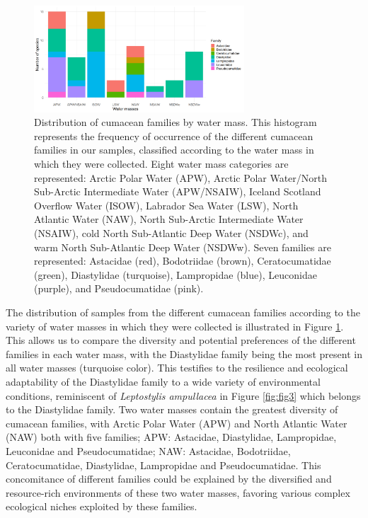 \begin{figure}[htbp]
    \centering
    \includegraphics[width=0.7\textwidth]{figure3.png}
    \caption{Distribution of cumacean families by water mass. This histogram represents the frequency of occurrence of the different cumacean families in our samples, classified according to the water mass in which they were collected. Eight water mass categories are represented: Arctic Polar Water (APW), Arctic Polar Water/North Sub-Arctic Intermediate Water (APW/NSAIW), Iceland Scotland Overflow Water (ISOW), Labrador Sea Water (LSW), North Atlantic Water (NAW), North Sub-Arctic Intermediate Water (NSAIW), cold North Sub-Atlantic Deep Water (NSDWc), and warm North Sub-Atlantic Deep Water (NSDWw). Seven families are represented: Astacidae (red), Bodotriidae (brown), Ceratocumatidae (green), Diastylidae (turquoise), Lampropidae (blue), Leuconidae (purple), and Pseudocumatidae (pink). \label{fig:fig4}}
\end{figure}

The distribution of samples from the different cumacean families according to the variety of water masses in which they were collected is illustrated in Figure \ref{fig:fig4}. This allows us to compare the diversity and potential preferences of the different families in each water mass, with the Diastylidae family being the most present in all water masses (turquoise color). This testifies to the resilience and ecological adaptability of the Diastylidae family to a wide variety of environmental conditions, reminiscent of \emph{Leptostylis ampullacea} in Figure \ref{fig:fig3} which belongs to the Diastylidae family. Two water masses contain the greatest diversity of cumacean families, with Arctic Polar Water (APW) and North Atlantic Water (NAW) both with five families; APW: Astacidae, Diastylidae, Lampropidae, Leuconidae and Pseudocumatidae; NAW: Astacidae, Bodotriidae, Ceratocumatidae, Diastylidae, Lampropidae and Pseudocumatidae. This concomitance of different families could be explained by the diversified and resource-rich environments of these two water masses, favoring various complex ecological niches exploited by these families.

